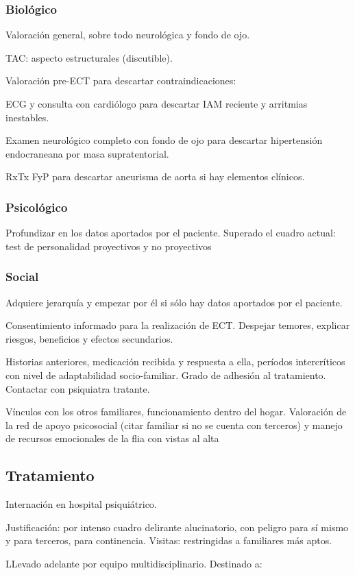 \subsubsection*{Biológico}
Valoración general, sobre todo neurológica y fondo de ojo.

TAC: aspecto estructurales (discutible).

Valoración pre-ECT para descartar contraindicaciones:

ECG y consulta con cardiólogo para descartar IAM reciente y arritmias inestables.

Examen neurológico completo con fondo de ojo para descartar hipertensión endocraneana por masa supratentorial.

RxTx FyP para descartar aneurisma de aorta si hay elementos clínicos.

\subsubsection*{Psicológico}
Profundizar en los datos aportados por el paciente. Superado el cuadro actual: test de personalidad proyectivos y no proyectivos
\subsubsection*{Social}
Adquiere jerarquía y empezar por él si sólo hay datos aportados por el paciente.

Consentimiento informado para la realización de ECT. Despejar temores, explicar riesgos, beneficios y efectos secundarios.

Historias anteriores, medicación recibida y respuesta a ella, períodos intercríticos con nivel de adaptabilidad socio-familiar. Grado de adhesión al tratamiento. Contactar con psiquiatra tratante.

Vínculos con los otros familiares, funcionamiento dentro del hogar. Valoración de la red de apoyo psicosocial (citar familiar si no se cuenta con terceros) y manejo de recursos emocionales de la flia con vistas al alta
\subsection*{Tratamiento}
Internación en hospital psiquiátrico.

Justificación: por intenso cuadro delirante alucinatorio, con peligro para sí mismo y para terceros, para continencia. Visitas: restringidas a familiares más aptos.

LLevado adelante por equipo multidisciplinario. Destinado a:

